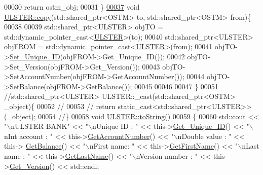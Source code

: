 \begin{DoxyCode}
00030     \textcolor{keywordflow}{return} ostm\_obj;
00031 \}
\hypertarget{_u_l_s_t_e_r_8cpp_source.tex_l00037}{}\hyperlink{class_u_l_s_t_e_r_aeef5c3e20f2a82344b4b83e5ccf4cc40_aeef5c3e20f2a82344b4b83e5ccf4cc40}{00037} \textcolor{keywordtype}{void} \hyperlink{class_u_l_s_t_e_r_aeef5c3e20f2a82344b4b83e5ccf4cc40_aeef5c3e20f2a82344b4b83e5ccf4cc40}{ULSTER::copy}(std::shared\_ptr<OSTM> to, std::shared\_ptr<OSTM> from)\{
00038 
00039     std::shared\_ptr<ULSTER> objTO = std::dynamic\_pointer\_cast<\hyperlink{class_u_l_s_t_e_r}{ULSTER}>(to);
00040     std::shared\_ptr<ULSTER> objFROM = std::dynamic\_pointer\_cast<\hyperlink{class_u_l_s_t_e_r}{ULSTER}>(from);
00041     objTO->\hyperlink{class_o_s_t_m_ab5019a32185631c08abbf826422f2d93_ab5019a32185631c08abbf826422f2d93}{Set\_Unique\_ID}(objFROM->Get\_Unique\_ID());
00042     objTO->Set\_Version(objFROM->Get\_Version());
00043     objTO->SetAccountNumber(objFROM->GetAccountNumber());
00044     objTO->SetBalance(objFROM->GetBalance());
00045 
00046     
00047 \}
00051 \textcolor{comment}{//std::shared\_ptr<ULSTER> ULSTER::\_cast(std::shared\_ptr<OSTM> \_object)\{}
00052 \textcolor{comment}{//}
00053 \textcolor{comment}{//    return static\_cast<std::shared\_ptr<ULSTER>>(\_object);}
00054 \textcolor{comment}{//\}}
\hypertarget{_u_l_s_t_e_r_8cpp_source.tex_l00058}{}\hyperlink{class_u_l_s_t_e_r_a341bbcb3f7d6ef10f30d4734ceed10ee_a341bbcb3f7d6ef10f30d4734ceed10ee}{00058} \textcolor{comment}{}\textcolor{keywordtype}{void} \hyperlink{class_u_l_s_t_e_r_a341bbcb3f7d6ef10f30d4734ceed10ee_a341bbcb3f7d6ef10f30d4734ceed10ee}{ULSTER::toString}()
00059 \{
00060    std::cout << \textcolor{stringliteral}{"\(\backslash\)nULSTER BANK"} << \textcolor{stringliteral}{"\(\backslash\)nUnique ID : "} << this->\hyperlink{class_o_s_t_m_a5a01a8b98d16b1d1904ecf9356e7b71d_a5a01a8b98d16b1d1904ecf9356e7b71d}{Get\_Unique\_ID}() << \textcolor{stringliteral}{"\(\backslash\)nInt account
       : "} << this->\hyperlink{class_u_l_s_t_e_r_a1ad672ae865a9f559bf4d3c33c243d63_a1ad672ae865a9f559bf4d3c33c243d63}{GetAccountNumber}() << \textcolor{stringliteral}{"\(\backslash\)nDouble value : "} << this->
      \hyperlink{class_u_l_s_t_e_r_ae70da9686ac038862900182a984e56eb_ae70da9686ac038862900182a984e56eb}{GetBalance}() << \textcolor{stringliteral}{"\(\backslash\)nFirst name: "} << this->\hyperlink{class_u_l_s_t_e_r_a85ee4e42d9b309608d8dfbedac65ff27_a85ee4e42d9b309608d8dfbedac65ff27}{GetFirstName}() << \textcolor{stringliteral}{"\(\backslash\)nLast name : "} << 
      this->\hyperlink{class_u_l_s_t_e_r_a9320b012bccda4ebf6b41c9ed972743c_a9320b012bccda4ebf6b41c9ed972743c}{GetLastName}()  << \textcolor{stringliteral}{"\(\backslash\)nVersion number : "} << this->\hyperlink{class_o_s_t_m_a1f1db9d482f22c8e7caa17dfb340626b_a1f1db9d482f22c8e7caa17dfb340626b}{Get\_Version}() << std::endl;

\end{DoxyCode}
